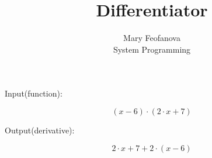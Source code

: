 \documentclass[12pt]{article}
\begin{document}
\title{Differentiator}
\author{Mary Feofanova\\
System Programming}
 
\maketitle
\begin{center}
Input(function):
\end{center}
$$(x-6) \cdot (2 \cdot x+7)$$
\begin{center}
Output(derivative):
\end{center}
$$2 \cdot x+7+2 \cdot (x-6)$$
\end{document}

